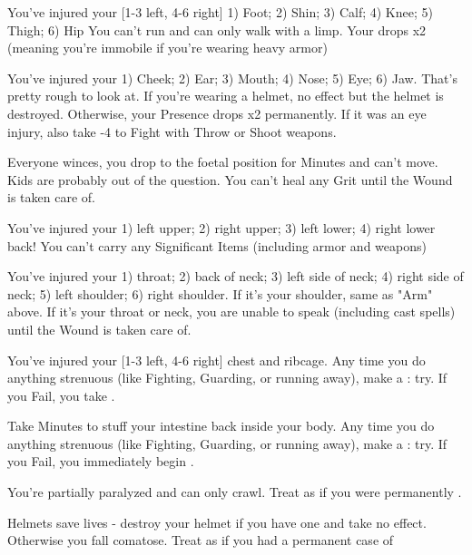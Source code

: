 {{    \item {} You've injured your [1-3 left, 4-6 right]  1) Foot; 2) Shin; 3) Calf; 4) Knee; 5) Thigh; 6) Hip  You can't run and can only walk with a limp.  Your \MD drops \DCDOWN x2 (meaning you're immobile if you're wearing heavy armor)
    
    \item {} You've injured your 1) Cheek; 2) Ear; 3) Mouth; 4) Nose; 5) Eye; 6) Jaw.  That's pretty rough to look at.  If you're wearing a helmet, no effect but the helmet is destroyed.  Otherwise, your \MAX Presence drops \DCDOWN x2 permanently. If it was an eye injury, also take -4 to Fight \RO with Throw or Shoot weapons. 

    \item {}  Everyone winces, you drop to the foetal position for Minutes and can't move.  Kids are probably out of the question.  You can't heal any Grit until the Wound is taken care of.

    \item {} You've injured your 1) left upper; 2) right upper; 3) left lower; 4) right lower back!  You can't carry any Significant Items (including armor and weapons)

    \item {}  You've injured your 1) throat; 2) back of neck; 3) left side of neck; 4) right side of neck; 5) left shoulder; 6) right shoulder. If it's your shoulder, same as "Arm" above.  If it's your throat or neck, you are unable to speak (including cast spells) until the Wound is taken care of.
    
    \item {}  You've injured your [1-3 left, 4-6 right] chest and ribcage. Any time you do anything strenuous (like Fighting, Guarding, or running away), make a \RS : \VIG try. If you Fail, you take .

    \item {} Take Minutes to stuff your intestine back inside your body.  Any time you do anything strenuous (like Fighting, Guarding, or running away), make a \RS : \VIG try. If you Fail, you immediately begin .

    \item {} You're partially paralyzed and can only crawl.  Treat as if you were permanently .

    \item {} Helmets save lives - destroy your helmet if you  have one and take no effect.  Otherwise you fall comatose.  Treat as if you had a permanent case of 
  }

}
